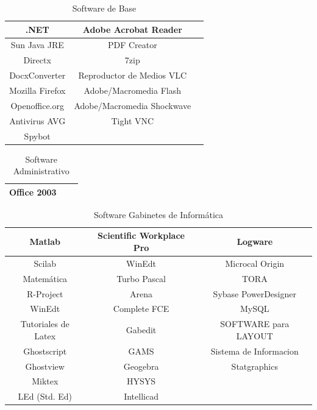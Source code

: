 \documentclass[10pt,a4paper,final]{article}
\begin{document}
\begin{table}
\caption{Software de Base}
\begin{center}\begin{tabular}{ccc}
\hline .NET & Adobe Acrobat Reader\\
\hline Sun Java JRE & PDF Creator\\
\hline Directx & 7zip\\
\hline DocxConverter & Reproductor de Medios VLC\\
\hline Mozilla Firefox & Adobe/Macromedia Flash\\
\hline Openoffice.org & Adobe/Macromedia Shockwave\\
\hline Antivirus AVG & Tight VNC\\
\hline Spybot & \\
\hline
\end{tabular}\end{center}
\label{tablaerrores}
\end{table}

\begin{table}
\caption{Software Administrativo}
\begin{center}\begin{tabular}{ccc}
\hline Office 2003 \\
\hline
\end{tabular}\end{center}
\end{table}

\begin{table}
\caption{Software Gabinetes de Informática}
\begin{center}\begin{tabular}{ccc}
\hline Matlab & Scientific Workplace Pro & Logware\\
\hline Scilab & WinEdt  & Microcal Origin\\
\hline Matemática & Turbo Pascal & TORA\\
\hline R-Project & Arena  & Sybase PowerDesigner\\
\hline WinEdt & Complete FCE & MySQL\\
\hline Tutoriales de Latex & Gabedit & SOFTWARE para LAYOUT\\
\hline Ghostscript & GAMS & Sistema de Informacion\\
\hline Ghostview & Geogebra & Statgraphics\\
\hline Miktex & HYSYS\\
\hline LEd (Std. Ed) & Intellicad\\
\hline
\end{tabular}\end{center}
\end{table}
\end{document}
